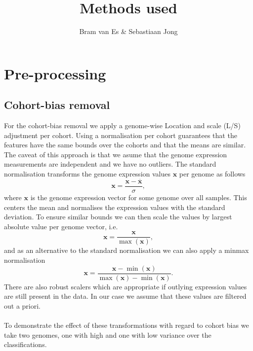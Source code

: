 \documentclass[a4paper,10pt]{article}
\title{Methods used}
\author{Bram van Es \& Sebastiaan Jong}
\begin{document}
\begin{abstract}

\end{abstract}




\section{Pre-processing}

\subsection{Cohort-bias removal}
%
For the cohort-bias removal we apply a genome-wise Location and scale (L/S) adjustment per cohort.
Using a normalisation per cohort guarantees that the features have the same bounds 
over the cohorts and that the means are similar. The caveat of this approach is that we asume 
that the genome expression measurements are independent and we have no outliers.
%
The standard normalisation transforms the genome expression values $\mathbf{x}$ per genome as follows
\begin{equation}
  \mathbf{x} = \frac{\mathbf{x} - \overline{\mathbf{x}}}{\sigma},
\end{equation}
%
where $\mathbf{x}$ is the genome expression vector for some genome over all samples. 
This centers the mean and normalises the  expression values with the standard deviation. 
To ensure similar bounds we can then scale the values by largest absolute value per genome vector, i.e.
\begin{equation}
  \mathbf{x} = \frac{\mathbf{x}}{\max{(\mathbf{x})}},
\end{equation}
%
and as an alternative to the standard normalisation we can also apply a minmax normalisation
\begin{equation}
 \mathbf{x} = \frac{\mathbf{x} - \min{(\mathbf{x})}}{\max{(\mathbf{x})} - \min{(\mathbf{x})}}.
\end{equation}
%
There are also robust scalers which are appropriate if outlying expression values 
are still present in the data. In our case we assume that these values are filtered out a priori. \\ \\
%
To demonstrate the effect of these transformations with regard to cohort bias we take two genomes, one with high and one with low variance
over the classifications. \\ \\
%
\end{document}
